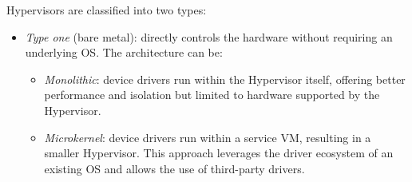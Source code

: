 Hypervisors are classified into two types:
\begin{itemize}
    \item \textit{Type one} (bare metal): directly controls the hardware without requiring an underlying OS.
        The architecture can be: 
        \begin{itemize}
            \item \textit{Monolithic}: device drivers run within the Hypervisor itself, offering better performance and isolation but limited to hardware supported by the Hypervisor.
            \item \textit{Microkernel}: device drivers run within a service VM, resulting in a smaller Hypervisor. 
                This approach leverages the driver ecosystem of an existing OS and allows the use of third-party drivers.
        \end{itemize}


\end{itemize}
